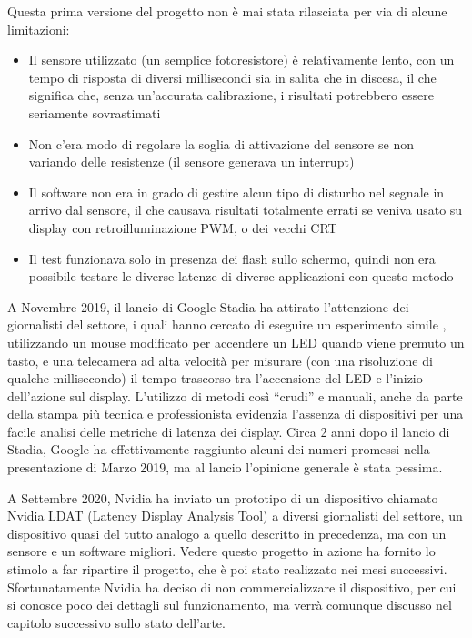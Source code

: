 Questa prima versione del progetto non è mai stata rilasciata per via di alcune limitazioni:
\begin{itemize}
	\item Il sensore utilizzato (un semplice fotoresistore) è relativamente lento\cite{adafruit_photores}, con un tempo di risposta di diversi millisecondi sia in salita che in discesa, il che significa che, senza un'accurata calibrazione, i risultati potrebbero essere seriamente sovrastimati
	\item Non c'era modo di regolare la soglia di attivazione del sensore se non variando delle resistenze (il sensore generava un interrupt)
	\item Il software non era in grado di gestire alcun tipo di disturbo nel segnale in arrivo dal sensore, il che causava risultati totalmente errati se veniva usato su display con retroilluminazione PWM, o dei vecchi CRT
	\item Il test funzionava solo in presenza dei flash sullo schermo, quindi non era possibile testare le diverse latenze di diverse applicazioni con questo metodo
\end{itemize}

A Novembre 2019, il lancio di Google Stadia ha attirato l'attenzione dei giornalisti del settore, i quali hanno cercato di eseguire un esperimento simile\cite{gamersnexus_stadia} \cite{gamersnexus_stadia2}, utilizzando un mouse modificato per accendere un LED quando viene premuto un tasto, e una telecamera ad alta velocità per misurare (con una risoluzione di qualche millisecondo) il tempo trascorso tra l'accensione del LED e l'inizio dell'azione sul display. L'utilizzo di metodi così ``crudi'' e manuali, anche da parte della stampa più tecnica e professionista evidenzia l'assenza di dispositivi per una facile analisi delle metriche di latenza dei display. Circa 2 anni dopo il lancio di Stadia, Google ha effettivamente raggiunto alcuni dei numeri promessi nella presentazione di Marzo 2019, ma al lancio l'opinione generale è stata pessima.

A Settembre 2020, Nvidia ha inviato un prototipo di un dispositivo chiamato Nvidia LDAT (Latency Display Analysis Tool) a diversi giornalisti del settore\cite{gamersnexus_nvidialdat}, un dispositivo quasi del tutto analogo a quello descritto in precedenza, ma con un sensore e un software migliori. Vedere questo progetto in azione ha fornito lo stimolo a far ripartire il progetto, che è poi stato realizzato nei mesi successivi. Sfortunatamente Nvidia ha deciso di non commercializzare il dispositivo, per cui si conosce poco dei dettagli sul funzionamento, ma verrà comunque discusso nel capitolo successivo sullo stato dell'arte.

